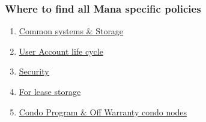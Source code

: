 \begin{frame}
\frametitle{Where to find all Mana specific policies}
\begin{enumerate}
\item \href{http://go.hawaii.edu/GSY}{Common systems \& Storage}
\item \href{http://go.hawaii.edu/0SG}{User Account life cycle}
\item \href{http://go.hawaii.edu/WSG}{Security}
\item \href{http://go.hawaii.edu/YKG}{For lease storage}
\item \href{http://go.hawaii.edu/GK0}{Condo Program \& Off Warranty condo nodes}
\end{enumerate}
\end{frame}
%
